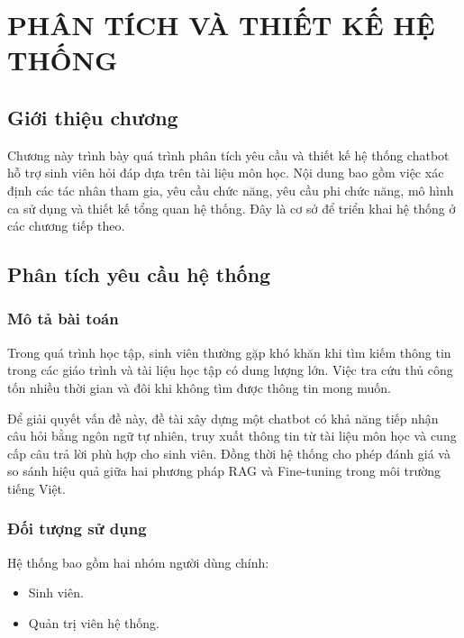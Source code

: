 \documentclass[12pt,a4paper]{report}
\begin{document}
	
	\chapter{PHÂN TÍCH VÀ THIẾT KẾ HỆ THỐNG}
	
	\section{Giới thiệu chương}
	
	Chương này trình bày quá trình phân tích yêu cầu và thiết kế hệ thống chatbot hỗ trợ sinh viên hỏi đáp dựa trên tài liệu môn học. Nội dung bao gồm việc xác định các tác nhân tham gia, yêu cầu chức năng, yêu cầu phi chức năng, mô hình ca sử dụng và thiết kế tổng quan hệ thống. Đây là cơ sở để triển khai hệ thống ở các chương tiếp theo.
	
	\section{Phân tích yêu cầu hệ thống}
	
	\subsection{Mô tả bài toán}
	
	Trong quá trình học tập, sinh viên thường gặp khó khăn khi tìm kiếm thông tin trong các giáo trình và tài liệu học tập có dung lượng lớn. Việc tra cứu thủ công tốn nhiều thời gian và đôi khi không tìm được thông tin mong muốn.
	
	Để giải quyết vấn đề này, đề tài xây dựng một chatbot có khả năng tiếp nhận câu hỏi bằng ngôn ngữ tự nhiên, truy xuất thông tin từ tài liệu môn học và cung cấp câu trả lời phù hợp cho sinh viên. Đồng thời hệ thống cho phép đánh giá và so sánh hiệu quả giữa hai phương pháp RAG và Fine-tuning trong môi trường tiếng Việt.
	
	\subsection{Đối tượng sử dụng}
	
	Hệ thống bao gồm hai nhóm người dùng chính:
	
	\begin{itemize}
		\item Sinh viên.
		\item Quản trị viên hệ thống.
	\end{itemize}
	
\end{document}

